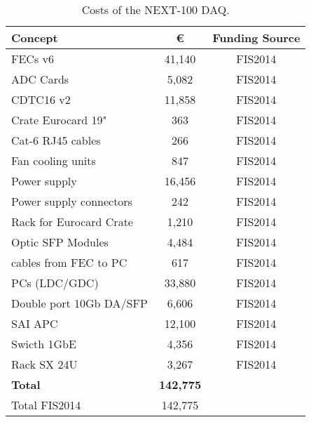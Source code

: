 \begin{table}[h!]
\begin{center}
\begin{tabular}{|l|c|c|}
\hline
 Concept & \euro & Funding Source \\
 \hline
FECs v6	&	41,140 & FIS2014 \\
ADC Cards	&	5,082 & FIS2014 \\
CDTC16 v2	&	11,858 & FIS2014 \\
Crate Eurocard 19" 	&	363 & FIS2014 \\
Cat-6 RJ45 cables & 266 & FIS2014 \\
Fan cooling units	&	847 & FIS2014 \\
Power supply & 	16,456 & FIS2014 \\
Power supply connectors &	242 & FIS2014 \\
Rack for Eurocard Crate	&	1,210 & FIS2014 \\
Optic SFP Modules &	4,484 & FIS2014 \\
cables from FEC to PC &	617 & FIS2014 \\
PCs (LDC/GDC)	&	33,880 & FIS2014 \\
Double port 10Gb DA/SFP & 6,606 & FIS2014 \\
SAI	APC	 &	12,100 & FIS2014 \\
Swicth 1GbE	& 4,356 & FIS2014 \\
Rack  SX 24U 	&	3,267 & FIS2014 \\						
  \hline
{\bf Total} &	{\bf 142,775}	& \\
 Total FIS2014	&	142,775& \\
 \hline\hline
\end{tabular}  
\caption{Costs of the NEXT-100 DAQ.}
\label{tab.n100:DAQ}
\end{center}
\end{table} 



